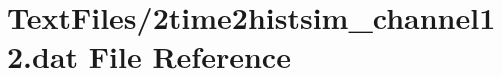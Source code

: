 \hypertarget{2time2histsim__channel12_8dat}{}\section{Text\+Files/2time2histsim\+\_\+channel12.dat File Reference}
\label{2time2histsim__channel12_8dat}
